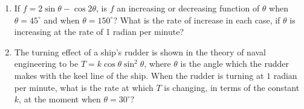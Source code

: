 \begin{enumerate}
    \item If $f = 2\sin \theta - \cos 2\theta$, is $f$ an increasing or decreasing function of $\theta$ when $\theta=45^\circ$ and when $\theta=150^\circ$? What is the rate of increase in each case, if $\theta$ is increasing at the rate of 1 radian per minute?
    \item The turning effect of a ship's rudder is shown in the theory of naval engineering to be $T= k \cos \theta \sin^2 \theta$, where $\theta$ is the angle which the rudder makes with the keel line of the ship. When the rudder is turning at $1$ radian per minute, what is the rate at which $T$ is changing, in terms of the constant $k$, at the moment when $\theta=30^\circ$?
\end{enumerate}
